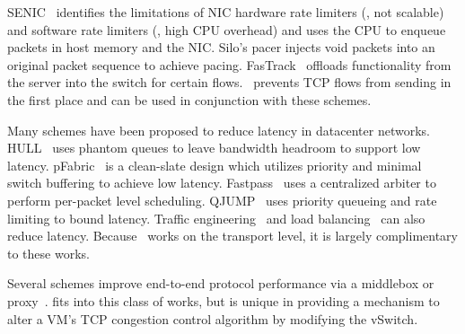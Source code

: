 SENIC~\cite{niranjan2013fastrak} 
identifies the limitations of NIC hardware rate limiters (\ie{}, not scalable) and 
software rate limiters (\ie{}, high CPU overhead) and uses the CPU to enqueue packets 
in host memory and the NIC. Silo's pacer injects void packets into 
an original packet sequence to achieve pacing. FasTrack~\cite{niranjan2013fastrak} offloads
functionality from the server into the switch for certain flows.~\acdc{} prevents
TCP flows from sending in the first place and can be used in conjunction with these
schemes.


Many schemes have been proposed to reduce latency in datacenter networks.
HULL~\cite{alizadeh2012less} uses phantom queues to leave bandwidth headroom to support low latency.
pFabric~\cite{alizadeh2013pfabric} is a clean-slate
design which utilizes priority and minimal switch buffering to achieve low latency.
Fastpass~\cite{perry2014fastpass} uses a centralized arbiter to
perform per-packet level scheduling.
QJUMP~\cite{qjump} uses priority queueing and rate limiting to
bound latency. Traffic engineering~\cite{al2010hedera,rasley2014planck} and 
load balancing~\cite{alizadeh2014conga,he2015presto,ghorbani2015micro} can also
reduce latency. Because~\acdc{} works on the transport level, it is
largely complimentary to these works.

Several schemes improve end-to-end protocol performance via a middlebox
or proxy~\cite{RFC3449,RFC3115,balakrishnan2008maelstrom,davern2011httpep,balakrishnan1995improving}.
\acdc{} fits into this class of works, but is unique in providing a mechanism
to alter a VM's TCP congestion control algorithm by modifying the vSwitch.

